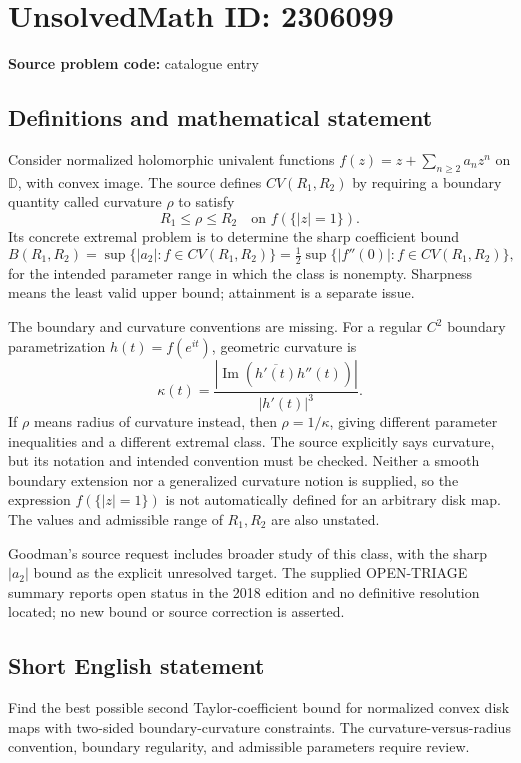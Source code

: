 \documentclass[11pt]{article}
\begin{document}
\section*{UnsolvedMath ID: 2306099}
\textbf{Source problem code:} catalogue entry
\subsection{Definitions and mathematical statement}
Consider normalized holomorphic univalent functions \(f(z)=z+\sum_{n\ge2}a_nz^n\) on \(\mathbb D\), with convex image. The source defines \(CV(R_1,R_2)\) by requiring a boundary quantity called curvature \(\rho\) to satisfy
\[
R_1\le\rho\le R_2\quad\text{on }f(\{|z|=1\}).
\]
Its concrete extremal problem is to determine the sharp coefficient bound
\[
B(R_1,R_2)=\sup\{|a_2|:f\in CV(R_1,R_2)\}
=\tfrac12\sup\{|f''(0)|:f\in CV(R_1,R_2)\},
\]
for the intended parameter range in which the class is nonempty. Sharpness means the least valid upper bound; attainment is a separate issue.

The boundary and curvature conventions are missing. For a regular \(C^2\) boundary parametrization \(h(t)=f(e^{it})\), geometric curvature is
\[
\kappa(t)=\frac{|\operatorname{Im}(\overline{h'(t)}h''(t))|}{|h'(t)|^3}.
\]
If \(\rho\) means radius of curvature instead, then \(\rho=1/\kappa\), giving different parameter inequalities and a different extremal class. The source explicitly says curvature, but its notation and intended convention must be checked. Neither a smooth boundary extension nor a generalized curvature notion is supplied, so the expression \(f(\{|z|=1\})\) is not automatically defined for an arbitrary disk map. The values and admissible range of \(R_1,R_2\) are also unstated.

Goodman's source request includes broader study of this class, with the sharp \(|a_2|\) bound as the explicit unresolved target. The supplied OPEN-TRIAGE summary reports open status in the 2018 edition and no definitive resolution located; no new bound or source correction is asserted.
\subsection{Short English statement}
Find the best possible second Taylor-coefficient bound for normalized convex disk maps with two-sided boundary-curvature constraints. The curvature-versus-radius convention, boundary regularity, and admissible parameters require review.
\end{document}
